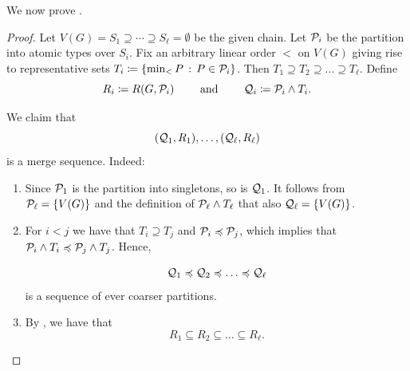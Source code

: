 We now prove .

\lembettermw*

\begin{proof}
    Let 
    $V(G)=S_1\supseteq\cdots\supseteq S_\ell=\emptyset$ be the given chain.
    Let $\mathcal P_i$ be the partition into atomic types over $S_i$.
    Fix an arbitrary linear order $<$ on $V(G)$ 
    giving rise to representative sets $T_i \coloneqq \{\min_< P \,:\, P \in \mathcal P_i\}$. 
    Then $T_1\supseteq T_2\supseteq \dots \supseteq T_\ell$.
    Define $$R_i \coloneqq R(G,\mathcal P_i)\qquad\text{ and }\qquad\mathcal Q_i \coloneqq \mathcal P_i \wedge T_i.$$

    We claim that 
    \[
        (\mathcal Q_1, R_1), \ldots, (\mathcal Q_\ell, R_\ell)
    \]
    is a merge sequence.  Indeed:
    \begin{enumerate}
        \item Since $\mathcal P_1$ is the partition into singletons, so is
        $\mathcal Q_1$.  
        It follows from $\mathcal P_\ell=\{V(G)\}$ and the definition of $\mathcal P_\ell \wedge T_\ell$ that also
        $\mathcal Q_\ell=\{V(G)\}$.

        \item For $i<j$ we have that $T_i\supseteq T_j$ and $\mathcal P_i\preccurlyeq \mathcal P_j$, which implies 
that  $\mathcal P_i\wedge T_i\preccurlyeq \mathcal P_j\wedge T_j$. Hence,

    \[
        \QQ_1 \preceq \QQ_2 \preceq \dots \preceq \QQ_\ell    
    \]
    is a sequence of ever coarser partitions.

    \item By , we have that 
    \[
        R_1 \subseteq R_2 \subseteq \dots \subseteq R_\ell.
    \]


\end{enumerate}
\end{proof}
